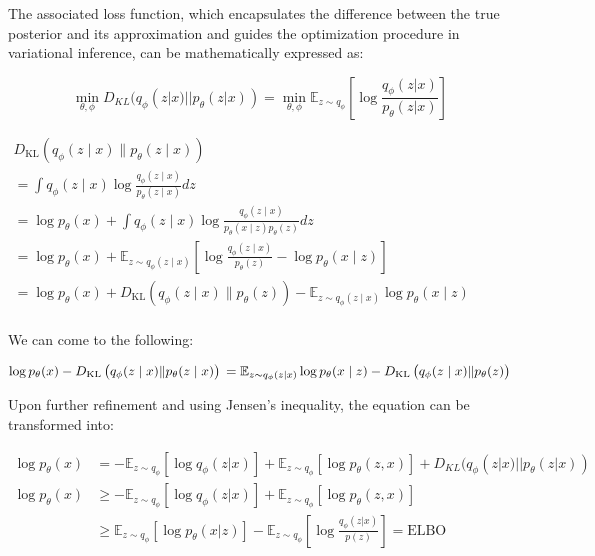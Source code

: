\documentclass[preprint,12pt,authoryear]{elsarticle}
\begin{document}
The associated loss function, which encapsulates the difference between the true posterior and its approximation and guides the optimization procedure in variational inference, can be mathematically expressed as:

\begin{equation} 
\min_{\theta,\phi} D_{KL}(q_\phi(z|x) || p_\theta(z|x)) = \min_{\theta,\phi} \mathbb{E}_{z \sim q_\phi}[\log \frac{q_\phi(z|x)}{p_\theta(z|x)}]
\end{equation} 

$
\begin{array}{l}

D_{\mathrm{KL}}\left(q_{\phi}(z \mid x) \| p_{\theta}(z \mid x)\right) \\
=\int q_{\phi}(z \mid x) \log \frac{q_{\phi}(z \mid x)}{p_{\theta}(z \mid x)} d z \\
=\log p_{\theta}(x)+\int q_{\phi}(z \mid x) \log \frac{q_{\phi}(z \mid x)}{p_{\theta}(x \mid z) p_{\theta}(z)} d z \\
=\log p_{\theta}(x)+\mathbb{E}_{z \sim q_{\phi}(z \mid x)}\left[\log \frac{q_{\phi}(z \mid x)}{p_{\theta}(z)}-\log p_{\theta}(x \mid z)\right] \\
=\log p_{\theta}(x)+D_{\mathrm{KL}}\left(q_{\phi}(z \mid x) \| p_{\theta}(z)\right)-\mathbb{E}_{z \sim q_{\phi}(z \mid x)} \log p_{\theta}(x \mid z) \\

\end{array}
$

We can come to the following:

\begin{equation}
    \log p_{\theta}(x)-D_{\mathrm{KL}}\left(q_{\phi}(z \mid x) \| p_{\theta}(z \mid x)\right)
    \\
    =\mathbb{E}_{z \sim q_{\phi}(z \mid x)} \log p_{\theta}(x \mid z)-D_{\mathrm{KL}}\left(q_{\phi}(z \mid x) \| p_{\theta}(z)\right)
\end{equation}

Upon further refinement and using Jensen's inequality, the equation can be transformed into:

\begin{align}
    \log p_\theta(x) &= -\mathbb{E}_{z\sim q_\phi}[\log q_\phi(z|x)] + \mathbb{E}_{z \sim q_\phi}[\log p_\theta(z, x)]
    + D_{KL}(q_\phi(z|x) || p_\theta(z|x)) \\
    \log p_\theta(x) &\geq  -\mathbb{E}_{z\sim q_\phi}[\log q_\phi(z|x)] + \mathbb{E}_{z\sim q_\phi}[\log p_\theta(z, x)] \\
    &\geq \mathbb{E}_{z\sim q_\phi}[\log p_\theta(x|z)] - \mathbb{E}_{z\sim q_\phi}[\log \frac{q_\phi(z|x)}{p(z)}] = \text{ELBO}
\end{align}
\end{document}
